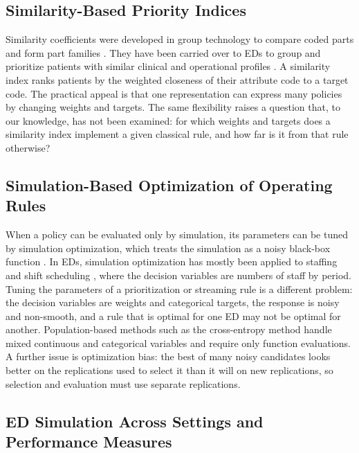 \subsection{Similarity-Based Priority Indices}

Similarity coefficients were developed in group technology to compare coded parts and form part families \cite{OFFODILE1990,Seifoddini01091986,YIN2005471}. They have been carried over to EDs to group and prioritize patients with similar clinical and operational profiles \cite{GT-in-ED_HCMS2016}. A similarity index ranks patients by the weighted closeness of their attribute code to a target code. The practical appeal is that one representation can express many policies by changing weights and targets. The same flexibility raises a question that, to our knowledge, has not been examined: for which weights and targets does a similarity index implement a given classical rule, and how far is it from that rule otherwise?

\subsection{Simulation-Based Optimization of Operating Rules}

When a policy can be evaluated only by simulation, its parameters can be tuned by simulation optimization, which treats the simulation as a noisy black-box function \cite{amaran2016simulation}. In EDs, simulation optimization has mostly been applied to staffing and shift scheduling \cite{Simulation-based-optimization-of-staffing-levels_2015,Wang2025EDStaffingSimOpt}, where the decision variables are numbers of staff by period. Tuning the parameters of a prioritization or streaming rule is a different problem: the decision variables are weights and categorical targets, the response is noisy and non-smooth, and a rule that is optimal for one ED may not be optimal for another. Population-based methods such as the cross-entropy method \cite{deBoer2005_CEMTutorial} handle mixed continuous and categorical variables and require only function evaluations. A further issue is optimization bias: the best of many noisy candidates looks better on the replications used to select it than it will on new replications, so selection and evaluation must use separate replications.

\subsection{ED Simulation Across Settings and Performance Measures}

